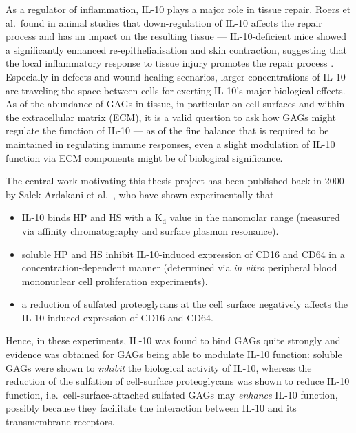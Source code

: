 As a regulator of inflammation, IL-10 plays a major role in tissue repair. Roers
et al.\ found in animal studies that down-regulation of IL-10 affects the repair
process and has an impact on the resulting tissue --- IL-10-deficient mice
showed a significantly enhanced re-epithelialisation and skin contraction,
suggesting that the local inflammatory response to tissue injury promotes the
repair process \cite{roers_il10mice_woundhealing_2007}. Especially in defects
and wound healing scenarios, larger concentrations of IL-10 are traveling the
space between cells for exerting IL-10's major biological effects. As of the
abundance of GAGs in tissue, in particular on cell surfaces and within the
extracellular matrix (ECM), it is a valid question to ask how GAGs might
regulate the function of IL-10 --- as of the fine balance that is required to be
maintained in regulating immune responses, even a slight modulation of IL-10
function via ECM components might be of biological significance.

The central work motivating this thesis project has been published back in 2000
by Salek-Ardakani et al.\ \cite{salek_ardakani_2000}, who have shown
experimentally that

\begin{itemize}
\item IL-10 binds HP and HS with a $\mathrm{K}_\mathrm{d}$
value in the nanomolar range (measured via affinity chromatography and surface
plasmon resonance).
\item soluble HP and HS inhibit IL-10-induced expression of CD16 and CD64 in a
concentration-dependent manner (determined via \textit{in vitro} peripheral
blood mononuclear cell proliferation experiments).
\item a reduction of sulfated proteoglycans at the cell surface negatively
affects the IL-10-induced expression of CD16 and CD64.
\end{itemize}

Hence, in these experiments, IL-10 was found to bind GAGs quite strongly and
evidence was obtained for GAGs being able to modulate IL-10 function: soluble
GAGs were shown to \textit{inhibit} the biological activity of IL-10, whereas
the reduction of the sulfation of cell-surface proteoglycans was shown to reduce
IL-10 function, i.e.\ cell-surface-attached sulfated GAGs may \textit{enhance}
IL-10 function, possibly because they facilitate the interaction between IL-10
and its transmembrane receptors.

